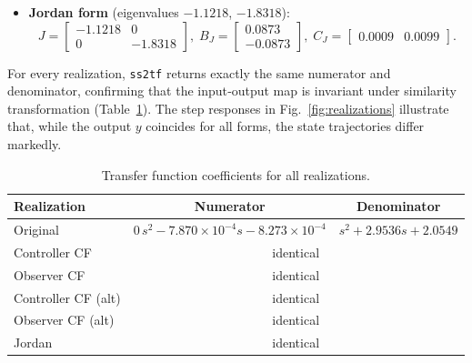 \documentclass[12pt,a4paper]{article}
\begin{document}
\begin{itemize}
    \[
    A_{ocf2} = \begin{bmatrix} -2.9536 & 1 \\ -2.0549 & 0 \end{bmatrix},\;
    B_{ocf2} = \begin{bmatrix} -7.870\times10^{-4} \\ -8.273\times10^{-4} \end{bmatrix},\;
    C_{ocf2} = \begin{bmatrix} 1 & 0 \end{bmatrix}.
    \]
    \item \textbf{Jordan form} (eigenvalues $-1.1218$, $-1.8318$):
    \[
    J = \begin{bmatrix} -1.1218 & 0 \\ 0 & -1.8318 \end{bmatrix},\;
    B_J = \begin{bmatrix} 0.0873 \\ -0.0873 \end{bmatrix},\;
    C_J = \begin{bmatrix} 0.0009 & 0.0099 \end{bmatrix}.
    \]
\end{itemize}
For every realization, \texttt{ss2tf} returns exactly the same numerator and denominator, confirming that the input‑output map is invariant under similarity transformation (Table~\ref{tab:tf_compare}). The step responses in Fig.~\ref{fig:realizations} illustrate that, while the output $y$ coincides for all forms, the state trajectories differ markedly.

\begin{table}[H]
\centering
\caption{Transfer function coefficients for all realizations.}
\label{tab:tf_compare}
\begin{tabular}{l|c|c}
\toprule
Realization & Numerator & Denominator \\
\midrule
Original & $0\,s^2 -7.870\!\times\!10^{-4}s -8.273\!\times\!10^{-4}$ & $s^2 + 2.9536s + 2.0549$ \\
Controller CF & \multicolumn{2}{c}{identical} \\
Observer CF & \multicolumn{2}{c}{identical} \\
Controller CF (alt) & \multicolumn{2}{c}{identical} \\
Observer CF (alt) & \multicolumn{2}{c}{identical} \\
Jordan & \multicolumn{2}{c}{identical} \\
\bottomrule
\end{tabular}
\end{table}
\end{document}
